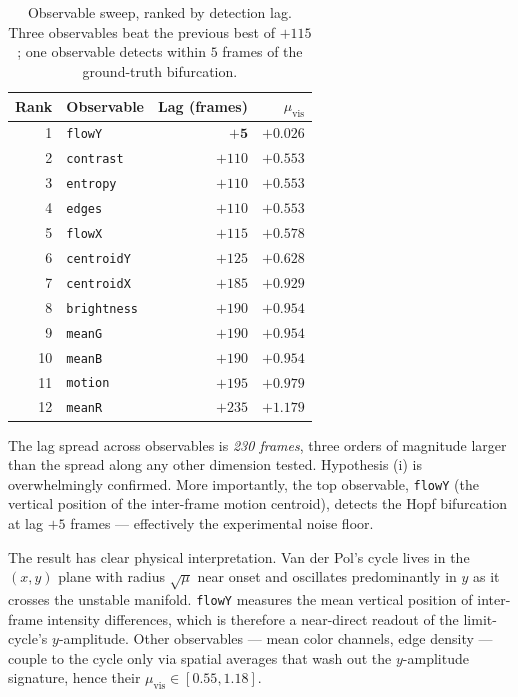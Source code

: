 \documentclass[11pt,a4paper]{article}
\begin{document}
\begin{table}[h]
\centering
\caption{Observable sweep, ranked by detection lag. Three observables
beat the previous best of $+115$; one observable detects within
$5$ frames of the ground-truth bifurcation.}
\label{tab:observable-sweep}
\begin{tabular}{rlrr}
\toprule
Rank & Observable & Lag (frames) & $\mu_{\text{vis}}$ \\
\midrule
1 & \texttt{flowY} & $\bm{+5}$ & $\bm{+0.026}$ \\
2 & \texttt{contrast} & $+110$ & $+0.553$ \\
3 & \texttt{entropy} & $+110$ & $+0.553$ \\
4 & \texttt{edges} & $+110$ & $+0.553$ \\
5 & \texttt{flowX} & $+115$ & $+0.578$ \\
6 & \texttt{centroidY} & $+125$ & $+0.628$ \\
7 & \texttt{centroidX} & $+185$ & $+0.929$ \\
8 & \texttt{brightness} & $+190$ & $+0.954$ \\
9 & \texttt{meanG} & $+190$ & $+0.954$ \\
10 & \texttt{meanB} & $+190$ & $+0.954$ \\
11 & \texttt{motion} & $+195$ & $+0.979$ \\
12 & \texttt{meanR} & $+235$ & $+1.179$ \\
\bottomrule
\end{tabular}
\end{table}

The lag spread across observables is \emph{230 frames}, three orders
of magnitude larger than the spread along any other dimension tested.
Hypothesis (i) is overwhelmingly confirmed. More importantly, the
top observable, \verb|flowY| (the vertical position of the
inter-frame motion centroid), detects the Hopf bifurcation at lag
$+5$ frames --- effectively the experimental noise floor.

The result has clear physical interpretation. Van der Pol's cycle
lives in the $(x,y)$ plane with radius $\sqrt{\mu}$ near onset and
oscillates predominantly in $y$ as it crosses the unstable manifold.
\verb|flowY| measures the mean vertical position of inter-frame
intensity differences, which is therefore a near-direct readout of
the limit-cycle's $y$-amplitude. Other observables --- mean color
channels, edge density --- couple to the cycle only via spatial
averages that wash out the $y$-amplitude signature, hence their
$\mu_{\text{vis}} \in [0.55, 1.18]$.
\end{document}
